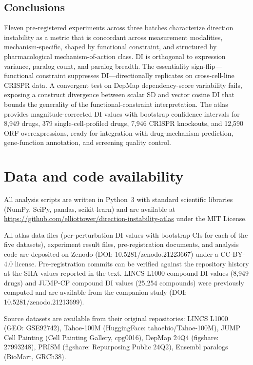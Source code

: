 \documentclass[11pt]{article}
\begin{document}
\subsection{Conclusions}

Eleven pre-registered experiments across three batches characterize
direction instability as a metric that is concordant across measurement
modalities, mechanism-specific, shaped by functional constraint, and
structured by pharmacological mechanism-of-action class.  DI is
orthogonal to expression variance, paralog count, and paralog
breadth.  The essentiality sign-flip---functional constraint suppresses
DI---directionally replicates on cross-cell-line CRISPR data.  A
convergent test on DepMap dependency-score variability fails, exposing a
construct divergence between scalar SD and vector cosine DI that
bounds the generality of the functional-constraint interpretation.  The
atlas provides magnitude-corrected DI values with bootstrap confidence
intervals for 8{,}949 drugs, 379 single-cell-profiled drugs, 7{,}946
CRISPR knockouts, and 12{,}590 ORF overexpressions, ready for
integration with drug-mechanism prediction, gene-function annotation,
and screening quality control.



\section*{Data and code availability}
All analysis scripts are written in Python~3 with standard scientific
libraries (NumPy, SciPy, pandas, scikit-learn) and are available at
\url{https://github.com/elliottower/direction-instability-atlas} under
the MIT License.

All atlas data files (per-perturbation DI values with bootstrap CIs for
each of the five datasets), experiment result files, pre-registration
documents, and analysis code are deposited on Zenodo
(DOI: 10.5281/zenodo.21223667) under a CC-BY-4.0 license.
Pre-registration commits can be verified against the repository history
at the SHA values reported in the text.  LINCS L1000 compound DI values
(8{,}949 drugs) and JUMP-CP compound DI values (25{,}254 compounds)
were previously computed and are available from the companion study
(DOI: 10.5281/zenodo.21213699).

Source datasets are available from their original repositories: LINCS
L1000 (GEO: GSE92742), Tahoe-100M (HuggingFace: tahoebio/Tahoe-100M),
JUMP Cell Painting (Cell Painting Gallery, cpg0016), DepMap 24Q4
(figshare: 27993248), PRISM (figshare: Repurposing Public 24Q2),
Ensembl paralogs (BioMart, GRCh38).
\end{document}

